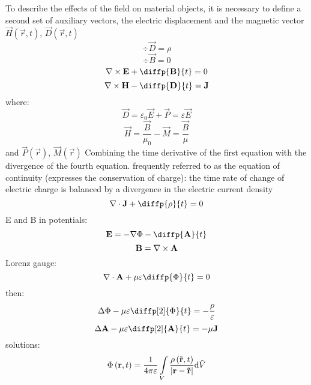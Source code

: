 To describe the effects of the field on material objects, it is necessary to define a second set of auxiliary vectors, the electric displacement and the magnetic vector $ \vec{H}\left( \vec{r}, t \right) $, $ \vec{D}\left( \vec{r}, t \right) $
\begin{equation}
\div{\vec{D}} = \rho
\end{equation}
\begin{equation}
\div{\vec{B}} = 0
\end{equation}
\begin{equation}
\rot{\vec{E}} + \diffp{\vec{B}}{t} = 0
\end{equation}
\begin{equation}
\rot{\vec{H}} - \diffp{\vec{D}}{t} = \vec{J}
\end{equation}
where:
\begin{equation}
\vec{D} = \varepsilon_0 \vec{E} + \vec{P} = \varepsilon \vec{E}
\end{equation}
\begin{equation}
\vec{H} = \frac{\vec{B}}{\mu_0} - \vec{M} = \frac{\vec{B}}{\mu} 
\end{equation}
and $ \vec{P}\left(\vec{r} \right) $, $ \vec{M}\left( \vec{r} \right) $
Combining the time derivative of the first equation with the divergence of the fourth equation.
frequently referred to as the equation of continuity (expresses the conservation of charge):
the time rate of change of electric charge is balanced by a divergence in the electric current density
\begin{equation}
\div{\vec{J}} + \diffp{\rho}{t} = 0
\end{equation}
E and B in potentials:
\begin{equation}
\vec{E} = -\grad{\Phi} - \diffp{\vec{A}}{t}
\end{equation}
\begin{equation}
\mathbf{B} = \nabla \times \mathbf{A}
\end{equation}
Lorenz gauge:
\begin{equation}
\div{\vec{A}} + \mu \varepsilon \diffp{\Phi}{t} = 0
\end{equation}
then:
\begin{equation}
\laplace{\Phi} - \mu \varepsilon \diffp[2]{\Phi}{t} = -\frac{\rho}{\varepsilon}
\end{equation}
\begin{equation}
\laplace{\vec{A}} - \mu \varepsilon \diffp[2]{\vec{A}}{t} = -\mu \vec{J}
\end{equation}
solutions:
\begin{equation}
\Phi\left(\mathbf{r}, t \right) = \frac{1}{4 \pi \varepsilon} \int\limits_{V} \frac{\rho\left(\mathbf{\tilde{r}}, t \right)}{\lvert\mathbf{r} - \mathbf{\tilde{r}}\rvert} \mathrm{d} \tilde{V}
\end{equation}
